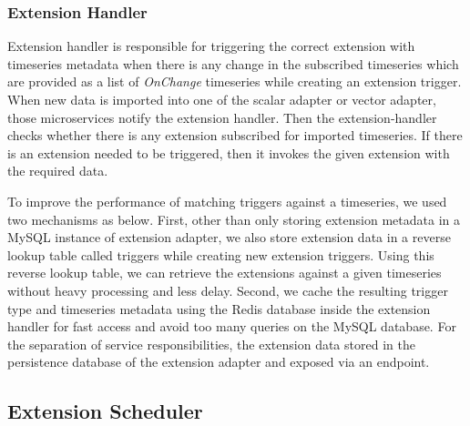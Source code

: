 \subsubsection{Extension Handler}

Extension handler is responsible for triggering the correct extension with timeseries metadata when there is any change in the subscribed timeseries which are provided as a list of \emph{OnChange} timeseries while creating an extension trigger.
When new data is imported into one of the scalar adapter or vector adapter, those microservices notify the extension handler. Then the extension-handler checks whether there is any extension subscribed for imported timeseries. If there is an extension needed to be triggered, then it invokes the given extension with the required data.

To improve the performance of matching triggers against a timeseries, we used two mechanisms as below. First, other than only storing extension metadata in a MySQL instance of extension adapter, we also store extension data in a reverse lookup table called triggers while creating new extension triggers. Using this reverse lookup table, we can retrieve the extensions against a given timeseries without heavy processing and less delay. Second, we cache the resulting trigger type and timeseries metadata using the Redis database inside the extension handler for fast access and avoid too many queries on the MySQL database. For the separation of service responsibilities, the extension data stored in the persistence database of the extension adapter and exposed via an endpoint.

\subsection{Extension Scheduler}

